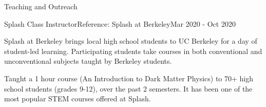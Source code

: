 \documentclass{resume} %
\begin{document}
\begin{rSection}{Teaching and Outreach}
\begin{rSubsection}{Splash Class Instructor}{}{Reference: Splash at Berkeley}{Mar 2020 - Oct 2020} \\
\item Splash at Berkeley brings local high school students to UC Berkeley for a day of student-led learning. Participating students take courses in both conventional and unconventional subjects taught by Berkeley students. 
\item Taught a 1 hour course (An Introduction to Dark Matter Physics) to 70+ high school students (grades 9-12), over the past 2 semesters. It has been one of the most popular STEM courses offered at Splash.
\end{rSubsection}


\end{rSection}
\end{document}
